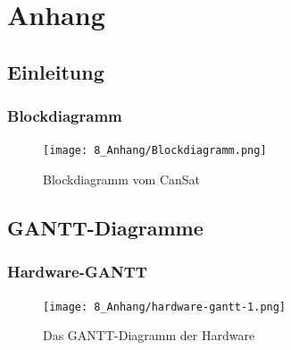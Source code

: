 \section{Anhang}

\subsection{Einleitung}
\subsubsection{Blockdiagramm}
\begin{figure}[htbp]
	\centering
	\texttt{[image: 8\_Anhang/Blockdiagramm.png]}
	\caption{Blockdiagramm vom CanSat}
	\label{blockdiagramm}
\end{figure}

\newpage

\subsection{GANTT-Diagramme}
\subsubsection {Hardware-GANTT}
\begin{figure}[H]
	\centering
	\texttt{[image: 8\_Anhang/hardware-gantt-1.png]}
	\caption{Das GANTT-Diagramm der Hardware}
	\label{gantt_hardware}
\end{figure}

